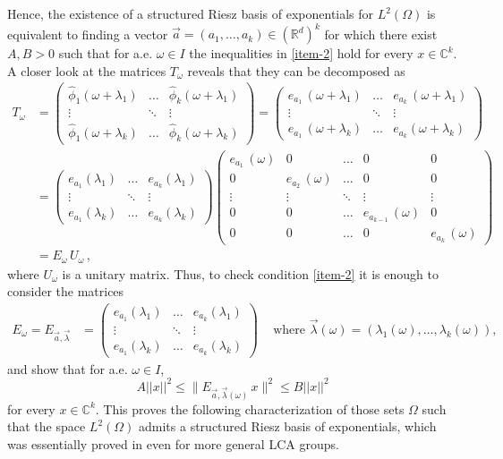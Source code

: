 \documentclass[a4paper,11pt]{amsart}
\theoremstyle{definition}
\theoremstyle{definition}
\def\la{\lambda}
\def\w{\omega}
\def\W{\Omega}
\def\R{\mathbb{R}}
\def\C{\mathbb{C}}
\begin{document}
Hence, the existence of a structured Riesz basis of exponentials for $L^2(\Omega)$ is equivalent to finding a vector $\vec{a}= (a_1,\dots,a_k) \in (\R^d)^k$ for which there exist $A,B>0$ such that for a.e. $\w\in I$ the inequalities in \eqref{item-2} hold for every $x\in\C^k$. A closer look at the matrices $T_\w$ reveals that they can be decomposed as
\begin{align*}
	T_\w&=\begin{pmatrix}
		\widehat{\phi}_1(\w+\la_{1})&\ldots& \widehat{\phi}_k(\w+\la_{1})\\
		\vdots&\ddots&\vdots\\
		\widehat{\phi}_1(\w+\la_{k})&\ldots& \widehat{\phi}_k(\w+\la_{k})
	\end{pmatrix}=\begin{pmatrix}
		e_{a_1}\, (\w+\la_1)     &\ldots&       e_{a_k}\, (\w+\la_1)  \\
		\vdots&\ddots&\vdots\\
		e_{a_1}\, (\w+\la_k)       &\ldots&    e_{a_k}(\w+\la_k) 
	\end{pmatrix}\nonumber \\&=
	\begin{pmatrix}
		e_{a_1}(\la_1) &\ldots& e_{a_k}(\la_1)   \\
		\vdots&\ddots&\vdots\\
		e_{a_1}(\la_{k})&\ldots& e_{a_k}(\la_{k})
	\end{pmatrix}\begin{pmatrix}
		e_{a_1}\, (\w)   &0&\ldots&0& 0\\
		0&e_{a_2}\, (\w)  &\ldots& 0&0\\
		\vdots&\vdots&\ddots&\vdots&\vdots\\
		0&0&\ldots& e_{a_{k-1}}\, (\w) &0\\
		0&0&\ldots& 0&e_{a_k}\, (\w) 
	\end{pmatrix}\nonumber\\ & = E_\w\, U_\w\,, 
\end{align*}
where $U_\w$ is a unitary matrix. 
Thus, to check condition \eqref{item-2} it is enough to consider the matrices
\begin{align}
	E_\w=E_{\vec{a},\vec{\la}}&=
	\begin{pmatrix}
		e_{a_1}(\la_1) &\ldots& e_{a_k}(\la_1)   \\
		\vdots&\ddots&\vdots\\
		e_{a_1}(\la_{k})&\ldots& e_{a_k}(\la_{k})
	\end{pmatrix}\,\quad \text{where } \vec{\la}(\w) = (\la_1(\w),\dots,\la_k(\w)), \label{Matrix E}
\end{align}
and show that for a.e. $\w\in I$,
$$A||x||^2 \leq \|E_{\vec{a},\vec{\la}(\w)} \,x\|^2\leq B||x||^2$$ for every $x\in\C^k$. This proves the following characterization of those sets $\W$ such that the space $L^2(\W)$ admits a structured Riesz basis of exponentials, which was essentially proved in \cite{AAC} even for more general LCA groups. 
\end{document}
